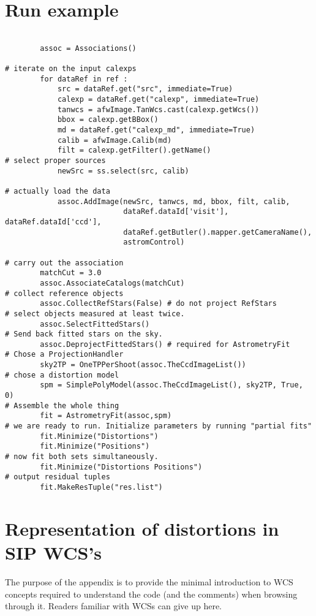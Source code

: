 \documentclass[a4paper,12pt]{scrartcl}
\begin{document}
\section{Run example}
\begin{verbatim}

        assoc = Associations()

# iterate on the input calexps        
        for dataRef in ref :
            src = dataRef.get("src", immediate=True)
            calexp = dataRef.get("calexp", immediate=True)
            tanwcs = afwImage.TanWcs.cast(calexp.getWcs())
            bbox = calexp.getBBox()
            md = dataRef.get("calexp_md", immediate=True)
            calib = afwImage.Calib(md)
            filt = calexp.getFilter().getName()
# select proper sources            
            newSrc = ss.select(src, calib)

# actually load the data            
            assoc.AddImage(newSrc, tanwcs, md, bbox, filt, calib,
                           dataRef.dataId['visit'], dataRef.dataId['ccd'],
                           dataRef.getButler().mapper.getCameraName(), 
                           astromControl)

# carry out the association        
        matchCut = 3.0
        assoc.AssociateCatalogs(matchCut)
# collect reference objects
        assoc.CollectRefStars(False) # do not project RefStars
# select objects measured at least twice.
        assoc.SelectFittedStars()
# Send back fitted stars on the sky.
        assoc.DeprojectFittedStars() # required for AstrometryFit
# Chose a ProjectionHandler
        sky2TP = OneTPPerShoot(assoc.TheCcdImageList())
# chose a distortion model
        spm = SimplePolyModel(assoc.TheCcdImageList(), sky2TP, True, 0)
# Assemble the whole thing
        fit = AstrometryFit(assoc,spm)
# we are ready to run. Initialize parameters by running "partial fits"
        fit.Minimize("Distortions")
        fit.Minimize("Positions")
# now fit both sets simultaneously.
        fit.Minimize("Distortions Positions")
# output residual tuples
        fit.MakeResTuple("res.list")
\end{verbatim}
  




\appendix
\section{Representation of distortions in SIP WCS's \label{sec:sip-wcs}}
The purpose of the appendix is to provide the minimal introduction
to WCS concepts required to understand the code (and the comments)
when browsing through it. Readers familiar with WCSs can give up here.
\end{document}
